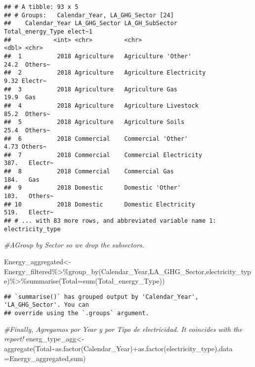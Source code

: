 \documentclass[
]{article}
\newenvironment{Shaded}{\begin{snugshade}}{\end{snugshade}}
\newcommand{\AttributeTok}[1]{\textcolor[rgb]{0.77,0.63,0.00}{#1}}
\newcommand{\CommentTok}[1]{\textcolor[rgb]{0.56,0.35,0.01}{\textit{#1}}}
\newcommand{\FunctionTok}[1]{\textcolor[rgb]{0.00,0.00,0.00}{#1}}
\newcommand{\NormalTok}[1]{#1}
\newcommand{\OtherTok}[1]{\textcolor[rgb]{0.56,0.35,0.01}{#1}}
\newcommand{\SpecialCharTok}[1]{\textcolor[rgb]{0.00,0.00,0.00}{#1}}
\begin{document}
\begin{verbatim}
## # A tibble: 93 x 5
## # Groups:   Calendar_Year, LA_GHG_Sector [24]
##    Calendar_Year LA_GHG_Sector LA_GH_SubSector         Total_energy_Type elect~1
##            <int> <chr>         <chr>                               <dbl> <chr>  
##  1          2018 Agriculture   Agriculture 'Other'                 24.2  Others~
##  2          2018 Agriculture   Agriculture Electricity              9.32 Electr~
##  3          2018 Agriculture   Agriculture Gas                     19.9  Gas    
##  4          2018 Agriculture   Agriculture Livestock               85.2  Others~
##  5          2018 Agriculture   Agriculture Soils                   25.4  Others~
##  6          2018 Commercial    Commercial 'Other'                   4.73 Others~
##  7          2018 Commercial    Commercial Electricity             387.   Electr~
##  8          2018 Commercial    Commercial Gas                     184.   Gas    
##  9          2018 Domestic      Domestic 'Other'                   103.   Others~
## 10          2018 Domestic      Domestic Electricity               519.   Electr~
## # ... with 83 more rows, and abbreviated variable name 1: electricity_type
\end{verbatim}

\begin{Shaded}
\begin{Highlighting}[]
\CommentTok{\#AGroup by Sector so we drop the subsectors.}

\NormalTok{Energy\_aggregated}\OtherTok{\textless{}{-}}\NormalTok{Energy\_filtered}\SpecialCharTok{\%\textgreater{}\%}\FunctionTok{group\_by}\NormalTok{(Calendar\_Year,LA\_GHG\_Sector,electricity\_type)}\SpecialCharTok{\%\textgreater{}\%}\FunctionTok{summarise}\NormalTok{(}\AttributeTok{Total=}\FunctionTok{sum}\NormalTok{(Total\_energy\_Type))}
\end{Highlighting}
\end{Shaded}

\begin{verbatim}
## `summarise()` has grouped output by 'Calendar_Year', 'LA_GHG_Sector'. You can
## override using the `.groups` argument.
\end{verbatim}

\begin{Shaded}
\begin{Highlighting}[]
\CommentTok{\#Finally, Agregamos por Year y por Tipo de electricidad. It coincides with the report!}
\NormalTok{energ\_type\_agg}\OtherTok{\textless{}{-}}\FunctionTok{aggregate}\NormalTok{(Total}\SpecialCharTok{\textasciitilde{}}\FunctionTok{as.factor}\NormalTok{(Calendar\_Year)}\SpecialCharTok{+}\FunctionTok{as.factor}\NormalTok{(electricity\_type),}\AttributeTok{data =}\NormalTok{Energy\_aggregated,sum)}
\end{Highlighting}
\end{Shaded}
\end{document}
